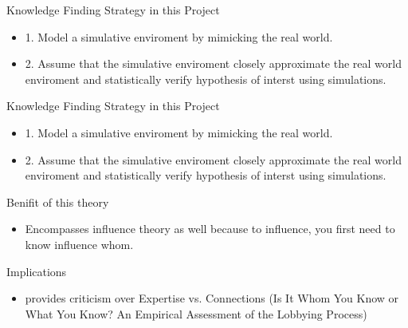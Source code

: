 \documentclass{beamer}
\begin{document}
	\begin{frame}{Knowledge Finding Strategy in this Project}
		\begin{itemize}
			\item 1. Model a simulative enviroment by mimicking the real world.
			\item 2. Assume that the simulative enviroment closely approximate the real world enviroment and statistically verify hypothesis of interst using simulations.
		\end{itemize}
	\end{frame}


	\begin{frame}{Knowledge Finding Strategy in this Project}
		\begin{itemize}
			\item 1. Model a simulative enviroment by mimicking the real world.
			\item 2. Assume that the simulative enviroment closely approximate the real world enviroment and statistically verify hypothesis of interst using simulations.
		\end{itemize}
	\end{frame}

	\begin{frame}{Benifit of this theory}
		\begin{itemize}
			\item Encompasses influence theory as well because to influence, you first need to know influence whom.
		\end{itemize}
	\end{frame}


	\begin{frame}{Implications}
		\begin{itemize}
			\item provides criticism over Expertise vs. Connections (Is It Whom You Know or What You Know?
			An Empirical Assessment of the Lobbying Process)
		\end{itemize}
	\end{frame}
\end{document}
